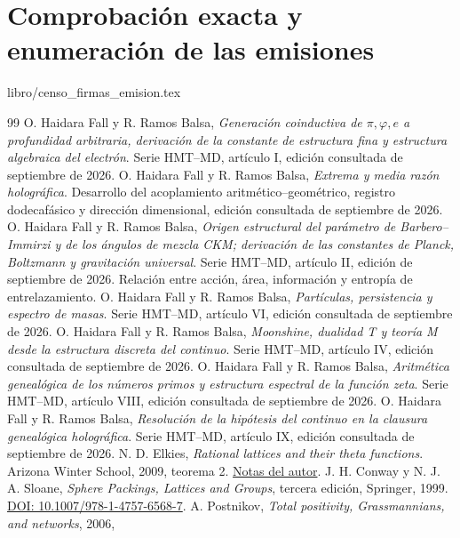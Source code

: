 \documentclass[a4paper,10pt]{article}
\theoremstyle{definition}\newtheorem{definition}[theorem]{Definición}
\theoremstyle{remark}\newtheorem{remark}[theorem]{Observación}
\numberwithin{equation}{section}
\begin{document}
\clearpage
\part{Comprobación exacta y enumeración de las emisiones}

{libro/censo_firmas_emision.tex}


\begin{thebibliography}{99}
 O. Haidara Fall y R. Ramos Balsa,
\emph{Generación coinductiva de \(\pi,\varphi,e\) a profundidad arbitraria,
derivación de la constante de estructura fina y estructura algebraica del
electrón}. Serie HMT--MD, artículo I, edición consultada de septiembre de 2026.
 O. Haidara Fall y R. Ramos Balsa,
\emph{Extrema y media razón holográfica}. Desarrollo del acoplamiento
aritmético--geométrico, registro dodecafásico y dirección dimensional,
edición consultada de septiembre de 2026.
 O. Haidara Fall y R. Ramos Balsa,
\emph{Origen estructural del parámetro de Barbero--Immirzi y de los
ángulos de mezcla CKM; derivación de las constantes de Planck, Boltzmann
y gravitación universal}. Serie HMT--MD, artículo II, edición de
septiembre de 2026. Relación entre acción, área, información y entropía
de entrelazamiento.
 O. Haidara Fall y R. Ramos Balsa,
\emph{Partículas, persistencia y espectro de masas}. Serie HMT--MD, artículo VI,
edición consultada de septiembre de 2026.
 O. Haidara Fall y R. Ramos Balsa,
\emph{Moonshine, dualidad T y teoría M desde la estructura discreta del
continuo}. Serie HMT--MD, artículo IV, edición consultada de septiembre de 2026.
 O. Haidara Fall y R. Ramos Balsa,
\emph{Aritmética genealógica de los números primos y estructura espectral
de la función zeta}. Serie HMT--MD, artículo VIII, edición consultada de septiembre de 2026.
 O. Haidara Fall y R. Ramos Balsa,
\emph{Resolución de la hipótesis del continuo en la clausura genealógica
holográfica}. Serie HMT--MD, artículo IX, edición consultada de septiembre de 2026.
 N. D. Elkies,
\emph{Rational lattices and their theta functions}. Arizona Winter School,
2009, teorema 2.
\href{https://people.math.harvard.edu/~elkies/aws09.pdf}{Notas del autor}.
 J. H. Conway y N. J. A. Sloane,
\emph{Sphere Packings, Lattices and Groups}, tercera edición, Springer, 1999.
\href{https://doi.org/10.1007/978-1-4757-6568-7}{DOI: 10.1007/978-1-4757-6568-7}.
 A. Postnikov,
\emph{Total positivity, Grassmannians, and networks}, 2006,

\end{thebibliography}
\end{document}
